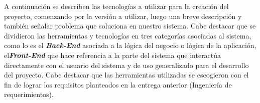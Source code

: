 \documentclass{memoria}
\begin{document}

A continuación se describen las tecnologías a utilizar para la creación del proyecto, comenzando por la versión a utilizar, luego una breve descripción y también señalar problema que soluciona en nuestro sistema. Cabe destacar que se dividieron las herramientas y tecnologías en tres categorías asociadas al sistema, como lo es el \textsl{\textbf{Back-End}} asociada a la lógica del negocio o lógica de la aplicación, el\textsl{\textbf{Front-End}} que hace referencia a la parte del sistema que interactúa directamente con el usuario del sistema y de uso generalizado para el desarrollo del proyecto. Cabe destacar que las herramientas utilizadas se escogieron con el fin de lograr los requisitos planteados en la entrega anterior (Ingeniería de requerimientos).

\end{document}
